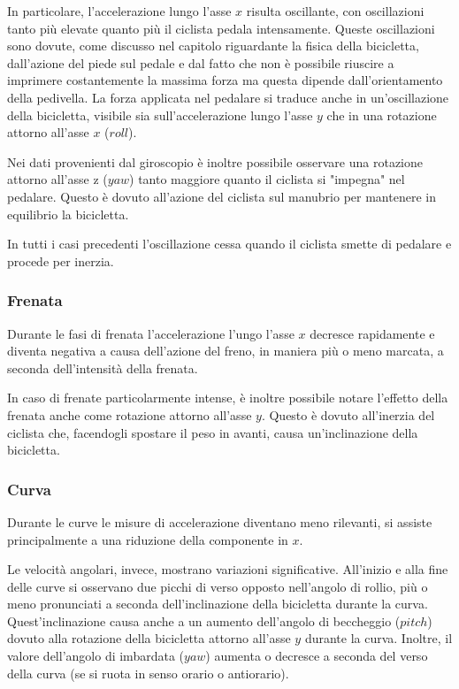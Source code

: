 \documentclass[12pt]{article}
\begin{document}
	In particolare, l'accelerazione lungo l'asse \(x\) risulta oscillante, con oscillazioni tanto più elevate quanto più il ciclista pedala intensamente. Queste oscillazioni sono dovute, come discusso nel capitolo riguardante la fisica della bicicletta, dall'azione del piede sul pedale e dal fatto che non è possibile riuscire a imprimere costantemente la massima forza ma questa dipende dall'orientamento della pedivella. La forza applicata nel pedalare si traduce anche in un'oscillazione della bicicletta, visibile sia sull'accelerazione lungo l'asse \(y\) che in una rotazione attorno all'asse \(x\) (\(roll\)).
	
	Nei dati provenienti dal giroscopio è inoltre possibile osservare una rotazione attorno all'asse z (\(yaw\)) tanto maggiore quanto il ciclista si "impegna" nel pedalare. Questo è dovuto all'azione del ciclista sul manubrio per mantenere in equilibrio la bicicletta.
	
	In tutti i casi precedenti l'oscillazione cessa quando il ciclista smette di pedalare e procede per inerzia.
	
	\subsubsection{Frenata}
	Durante le fasi di frenata l'accelerazione l'ungo l'asse \(x\) decresce rapidamente e diventa negativa a causa dell'azione del freno, in maniera più o meno marcata, a seconda dell'intensità della frenata.
	
	In caso di frenate particolarmente intense, è inoltre possibile notare l'effetto della frenata anche come rotazione attorno all'asse \(y\). Questo è dovuto all'inerzia del ciclista che, facendogli spostare il peso in avanti, causa un'inclinazione della bicicletta.
	
	\subsubsection{Curva}	
	Durante le curve le misure di accelerazione diventano meno rilevanti, si assiste principalmente a una riduzione della componente in \(x\).
	
	Le velocità angolari, invece, mostrano variazioni significative. All'inizio e alla fine delle curve si osservano due picchi di verso opposto nell'angolo di rollio, più o meno pronunciati a seconda dell'inclinazione della bicicletta durante la curva.
	Quest'inclinazione causa anche a un aumento dell'angolo di beccheggio (\(pitch\)) dovuto alla rotazione della bicicletta attorno all'asse \(y\) durante la curva.
	Inoltre, il valore dell'angolo di imbardata (\(yaw\)) aumenta o decresce a seconda del verso della curva (se si ruota in senso orario o antiorario).
	
\end{document}
